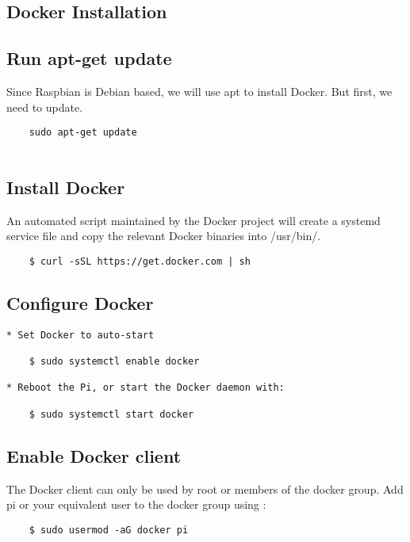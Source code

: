 \subsection{Docker Installation}

\subsection{Run apt-get update}

Since Raspbian is Debian based, we will use apt to install Docker. But
first, we need to update.

\begin{lstlisting}
    sudo apt-get update
            
\end{lstlisting}

\subsection{Install Docker}

An automated script maintained by the Docker project will create a
systemd service file and copy the relevant Docker binaries into
/usr/bin/.

\begin{lstlisting}
    $ curl -sSL https://get.docker.com | sh
\end{lstlisting}

\subsection{Configure Docker}

\begin{lstlisting}
* Set Docker to auto-start
        
    $ sudo systemctl enable docker
            
* Reboot the Pi, or start the Docker daemon with:

    $ sudo systemctl start docker
\end{lstlisting}

\subsection{Enable Docker client}

The Docker client can only be used by root or members of the docker
group. Add pi or your equivalent user to the docker group using :

\begin{lstlisting}
    $ sudo usermod -aG docker pi
            
\end{lstlisting}

